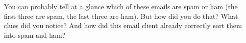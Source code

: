 You can probably tell at a glance which of these emails are spam or ham (the first three are spam, the last three are ham). But how did you do that? What clues did you notice?  And how did this email client already correctly sort them into spam and ham?




